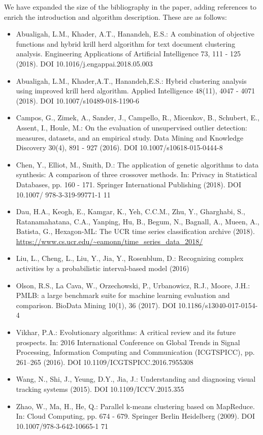 \documentclass[11pt]{article}
\begin{document}
We have expanded the size of the bibliography in the paper, adding references to
enrich the introduction and algorithm description. These are as follows:
\begin{itemize}
    \item Abualigah, L.M., Khader, A.T., Hanandeh, E.S.: A combination of
        objective functions and hybrid krill herd algorithm for text document
        clustering analysis. Engineering Applications of Artificial Intelligence
        73, 111 \-- 125 (2018). DOI 10.1016/j.engappai.2018.05.003
    \item Abualigah, L.M., Khader,A.T., Hanandeh,E.S.: Hybrid clustering
        analysis using improved krill herd algorithm. Applied Intelligence
        48(11), 4047 \-- 4071 (2018). DOI 10.1007/s10489-018-1190-6
    \item Campos, G., Zimek, A., Sander, J., Campello, R., Micenkov, B.,
        Schubert, E., Assent, I., Houle, M.: On the evaluation of unsupervised
        outlier detection: measures, datasets, and an empirical study. Data
        Mining and Knowledge Discovery 30(4), 891 \-- 927 (2016). DOI
        10.1007/s10618-015-0444-8
    \item Chen, Y., Elliot, M., Smith, D.: The application of genetic algorithms
        to data synthesis: A comparison of three crossover methods. In: Privacy
        in Statistical Databases, pp. 160 \-- 171. Springer International
        Publishing (2018). DOI 10.1007/ 978-3-319-99771-1 11
    \item Dau, H.A., Keogh, E., Kamgar, K., Yeh, C.C.M., Zhu, Y., Gharghabi, S.,
        Ratanamahatana, C.A., Yanping, Hu, B., Begum, N., Bagnall, A., Mueen,
        A., Batista, G., Hexagon-ML: The UCR time series classification archive
        (2018). \url{https://www.cs.ucr.edu/~eamonn/time_series_data_2018/}
    \item Liu, L., Cheng, L., Liu, Y., Jia, Y., Rosenblum, D.: Recognizing
        complex activities by a probabilistic interval-based model (2016)
    \item Olson, R.S., La Cava, W., Orzechowski, P., Urbanowicz, R.J., Moore,
        J.H.: PMLB: a large benchmark suite for machine learning evaluation and
        comparison. BioData Mining 10(1), 36 (2017). DOI
        10.1186/s13040-017-0154-4
    \item Vikhar, P.A.: Evolutionary algorithms: A critical review and its
        future prospects. In: 2016 International Conference on Global Trends in
        Signal Processing, Information Computing and Communication (ICGTSPICC),
        pp. 261–265 (2016). DOI 10.1109/ICGTSPICC.2016.7955308
    \item Wang, N., Shi, J., Yeung, D.Y., Jia, J.: Understanding and diagnosing
        visual tracking systems (2015). DOI 10.1109/ICCV.2015.355
    \item Zhao, W., Ma, H., He, Q.: Parallel k-means clustering based on
        MapReduce. In: Cloud Computing, pp. 674 \-- 679. Springer Berlin
        Heidelberg (2009). DOI 10.1007/978-3-642-10665-1 71
\end{itemize}
\end{document}
